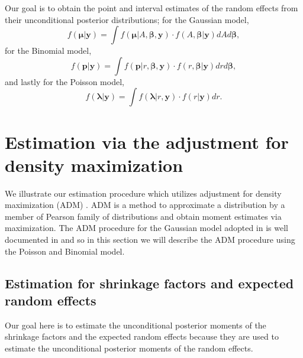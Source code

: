 \documentclass[article]{jss}
\begin{document}
Our goal is to obtain the point and interval estimates of the random effects from their unconditional posterior distributions; for the Gaussian  model, 
\begin{equation}\label{mcintegration_normal}
f(\boldsymbol{\mu}\vert \boldsymbol{y})=\int  f(\boldsymbol{\mu}\vert A, \boldsymbol{\beta}, \boldsymbol{y})\cdot f(A, \boldsymbol{\beta}\vert \boldsymbol{y})dA d\boldsymbol{\beta},
\end{equation}
for the Binomial  model, 
\begin{equation}\label{mcintegration_binomial}
f(\boldsymbol{p}\vert \boldsymbol{y})=\int  f(\boldsymbol{p}\vert r, \boldsymbol{\beta}, \boldsymbol{y})\cdot f(r, \boldsymbol{\beta}\vert \boldsymbol{y})dr d\boldsymbol{\beta},
\end{equation}
and lastly for the Poisson  model, 
\begin{equation}\label{mcintegration_poisson}
f(\boldsymbol{\lambda}\vert \boldsymbol{y})=\int  f(\boldsymbol{\lambda}\vert r, \boldsymbol{y})\cdot f(r\vert \boldsymbol{y})dr.
\end{equation}



\section[Estimation]{Estimation via the adjustment for density maximization}\label{sec3}



We illustrate our estimation procedure which utilizes adjustment for density maximization (ADM) \citep{carl1988, morris1997, tang2011}. ADM is a method  to  approximate a distribution by a member of Pearson family of distributions and obtain moment estimates via maximization. The ADM procedure for the Gaussian model adopted in  is well documented in \cite{kelly2014advances} and so in this section we will describe  the ADM procedure  using the Poisson and Binomial model. 

\subsection[shrinkage]{Estimation for shrinkage factors and expected random effects}\label{shrinkage}

Our goal here is to estimate the unconditional posterior moments of the shrinkage factors and the expected random effects because they are used to estimate the unconditional posterior moments of the random effects. 
\end{document}
